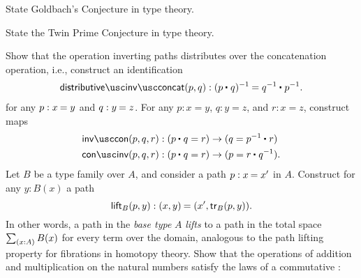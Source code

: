 \begin{exercises}
\exercise
  \begin{subexenum}
  \item State Goldbach's Conjecture in type theory.
  \item State the Twin Prime Conjecture in type theory.
  \end{subexenum}
\exercise \label{ex:inv_assoc}Show that the operation inverting paths distributes over the concatenation operation, i.e., construct an identification
  \begin{align*}
    \distributiveinvconcat(p,q):\id{(\ct{p}{q})^{-1}}{\ct{q^{-1}}{p^{-1}}}.
  \end{align*}
  for any $p:\id{x}{y}$ and $q:\id{y}{z}$.
\exercise \label{ex:inv_con}For any $p:x=y$, $q:y=z$, and $r:x=z$, construct maps
  \begin{align*}
    \invcon(p,q,r) & : (\ct{p}{q}=r)\to (q=\ct{p^{-1}}{r}) \\
    \coninv(p,q,r) & : (\ct{p}{q}=r)\to (p=\ct{r}{q^{-1}}).
  \end{align*}
\exercise Let $B$ be a type family over $A$, and consider a path $p:\id{x}{x'}$ in $A$. Construct for any $y:B(x)$ a path
  \begin{equation*}
    \lift_B(p,y) : \id{(x,y)}{(x',\tr_B(p,y))}.
  \end{equation*}
  In other words, a path in the \emph{base type} $A$ \emph{lifts} to a path in the total space $\sm{x:A}B(x)$ for every term over the domain, analogous to the path lifting property for fibrations in homotopy theory.
\exercise \label{ex:semi-ring-laws-N}Show that the operations of addition and multiplication on the natural numbers satisfy the laws of a commutative
  :%

\end{exercises}
